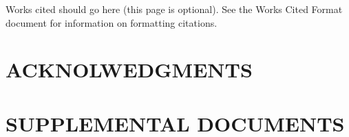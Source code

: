 Works cited should go here (this page is optional). See the Works Cited Format document for information on formatting citations.


\backmatter
\printindex
\printbibliography



\pagebreak 

\chapter{ACKNOLWEDGMENTS}
\label{acknolwedgments}

\pagebreak 

\chapter{SUPPLEMENTAL DOCUMENTS}
\label{supplementaldocuments}

